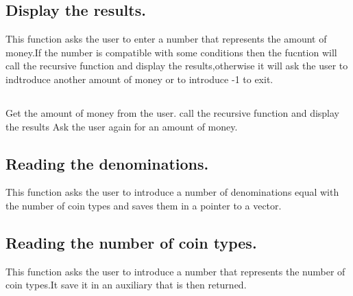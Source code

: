 \documentclass{report}
\begin{document}
\newpage
\subsection*{Display the results.}
This function asks the user to enter a number that represents the amount of money.If the number is compatible with some conditions then the fucntion will call the recursive function and display the results,otherwise it will ask the user to indtroduce another amount of money or to introduce -1 to exit.
\subsection*{}

\begin{algorithm}[H]
    {Get the amount of money from the user.\;}
     {
         {
            call the recursive function and display the results\;
        }{
            Ask the user again for an amount of money.\;
        }
    }
    \caption{Display the results.}
\end{algorithm}

\subsection*{Reading the denominations.}
This function asks the user to introduce a number of denominations equal with the number of coin types and saves them in a pointer to a vector.
\subsection*{}

\begin{algorithm}[H]
    \caption{Reading the denominations.}
\end{algorithm}

\newpage
\subsection*{Reading the number of coin types.}
This function asks the user to introduce a number that represents the number of coin types.It save it in an auxiliary that is then returned.
\end{document}
